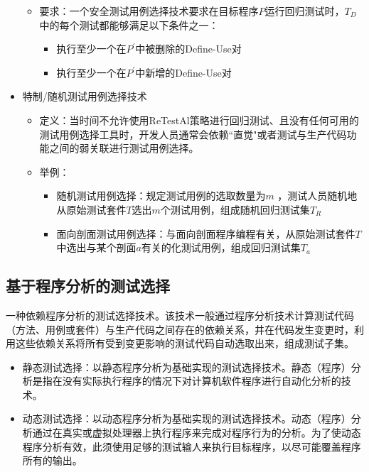 \begin{itemize}
\begin{itemize}
        \item 要求：一个安全测试用例选择技术要求在目标程序$P$运行回归测试时，$T_D$中的每个测试都能够满足以下条件之一：
        \begin{itemize}
            \item 执行至少一个在$P^\prime$中被删除的Define-Use对
            \item 执行至少一个在$P^\prime$中新增的Define-Use对
        \end{itemize}
    \end{itemize}
    \item 特制/随机测试用例选择技术
    \begin{itemize}
        \item 定义：当时间不允许使用ReTestAl策略进行回归测试、且没有任何可用的测试用例选择工具时，开发人员通常会依赖“直觉"或者测试与生产代码功能之间的弱关联进行测试用例选择。
        \item 举例：
        \begin{itemize}
            \item 随机测试用例选择：规定测试用例的选取数量为$m$ ，测试人员随机地从原始测试套件$T$选出$m$个测试用例，组成随机回归测试集$T_R$
            \item 面向剖面测试用例选择：与面向剖面程序编程有关，从原始测试套件$T$中选出与某个剖面$a$有关的化测试用例，组成回归测试集$T_a$
        \end{itemize}
    \end{itemize}
\end{itemize}

\subsection{基于程序分析的测试选择}
一种依赖程序分析的测试选择技术。该技术一般通过程序分析技术计算测试代码（方法、用例或套件）与生产代码之间存在的依赖关系，井在代码发生变更时，利用这些依赖关系将所有受到变更影响的测试代码自动选取出来，组成测试子集。

\begin{itemize}
    \item 静态测试选择：以静态程序分析为基础实现的测试选择技术。静态（程序）分析是指在没有实际执行程序的情况下对计算机软件程序进行自动化分析的技术。
    \item 动态测试选择：以动态程序分析为基础实现的测试选择技术。动态（程序）分析通过在真实或虚拟处理器上执行程序来完成对程序行为的分析。为了使动态程序分析有效，此须使用足够的测试输人来执行目标程序，以尽可能覆盖程序所有的输出。
\end{itemize}

